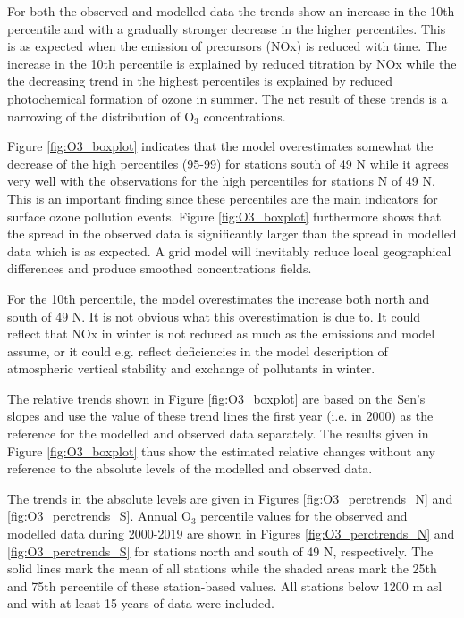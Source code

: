 For both the observed and modelled data the trends show an increase in the 10th percentile and with a gradually stronger decrease in the higher percentiles. This is as expected when the emission of precursors (NOx) is reduced with time. The increase in the 10th percentile is explained by reduced titration by NOx while the the decreasing trend in the highest percentiles is explained by reduced photochemical formation of ozone in summer. The net result of these trends is a narrowing of the distribution of O$_3$ concentrations. 

Figure \ref{fig:O3_boxplot} indicates that the model overestimates somewhat the decrease of the high percentiles (95-99) for stations south of 49 \degrees N while it agrees very well with the observations for the high percentiles for stations N of 49 \degrees N. This is an important finding since these percentiles are the main indicators for surface ozone pollution events. Figure \ref{fig:O3_boxplot} furthermore shows that the spread in the observed data is significantly larger than the spread in modelled data which is as expected. A grid model will inevitably reduce local geographical differences and produce smoothed concentrations fields. 

For the 10th percentile, the model overestimates the increase both north and south of 49 \degrees N. It is not obvious what this overestimation is due to. It could reflect that NOx in winter is not reduced as much as the emissions and model assume, or it could e.g. reflect deficiencies in the model description of atmospheric vertical stability and exchange of pollutants in winter. 

The relative trends shown in Figure \ref{fig:O3_boxplot} are based on the Sen's slopes and use the value of these trend lines the first year (i.e. in 2000) as the reference for the modelled and observed data separately. The results given in Figure \ref{fig:O3_boxplot} thus show the estimated relative changes without any reference to the absolute levels of the modelled and observed data. 

The trends in the absolute levels are given in Figures \ref{fig:O3_perctrends_N} and \ref{fig:O3_perctrends_S}. Annual O$_3$ percentile values for the observed and modelled data during 2000-2019 are shown in Figures \ref{fig:O3_perctrends_N} and \ref{fig:O3_perctrends_S} for stations north and south of 49 \degrees N, respectively. The solid lines mark the mean of all stations while the shaded areas mark the 25th and 75th percentile of these station-based values. All stations below 1200 m asl and with at least 15 years of data were included. 

